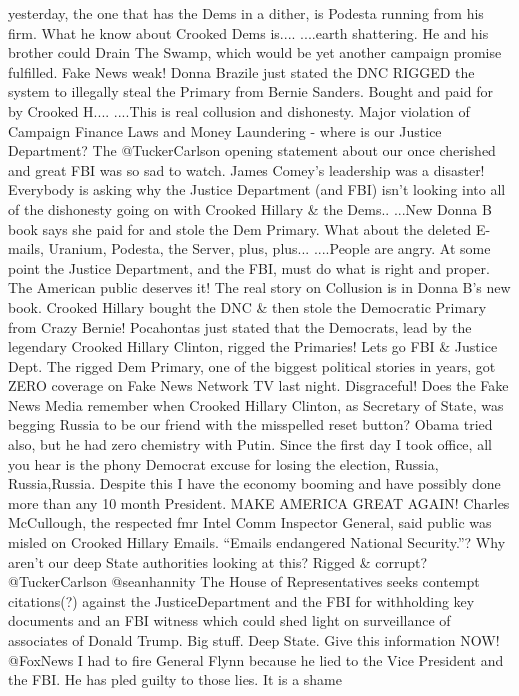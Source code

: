 yesterday, the one that has the Dems in a dither, is Podesta running
from his firm. What he know about Crooked Dems is.... ....earth
shattering. He and his brother could Drain The Swamp, which would be yet
another campaign promise fulfilled. Fake News weak! Donna Brazile just
stated the DNC RIGGED the system to illegally steal the Primary from
Bernie Sanders. Bought and paid for by Crooked H.... ....This is real
collusion and dishonesty. Major violation of Campaign Finance Laws and
Money Laundering - where is our Justice Department? The @TuckerCarlson
opening statement about our once cherished and great FBI was so sad to
watch. James Comey's leadership was a disaster! Everybody is asking why
the Justice Department (and FBI) isn't looking into all of the
dishonesty going on with Crooked Hillary \& the Dems.. ...New Donna B
book says she paid for and stole the Dem Primary. What about the deleted
E-mails, Uranium, Podesta, the Server, plus, plus... ....People are
angry. At some point the Justice Department, and the FBI, must do what
is right and proper. The American public deserves it! The real story on
Collusion is in Donna B's new book. Crooked Hillary bought the DNC \&
then stole the Democratic Primary from Crazy Bernie! Pocahontas just
stated that the Democrats, lead by the legendary Crooked Hillary
Clinton, rigged the Primaries! Lets go FBI \& Justice Dept. The rigged
Dem Primary, one of the biggest political stories in years, got ZERO
coverage on Fake News Network TV last night. Disgraceful! Does the Fake
News Media remember when Crooked Hillary Clinton, as Secretary of State,
was begging Russia to be our friend with the misspelled reset button?
Obama tried also, but he had zero chemistry with Putin. Since the first
day I took office, all you hear is the phony Democrat excuse for losing
the election, Russia, Russia,Russia. Despite this I have the economy
booming and have possibly done more than any 10 month President. MAKE
AMERICA GREAT AGAIN! Charles McCullough, the respected fmr Intel Comm
Inspector General, said public was misled on Crooked Hillary Emails.
``Emails endangered National Security.''? Why aren't our deep State
authorities looking at this? Rigged \& corrupt? @TuckerCarlson
@seanhannity The House of Representatives seeks contempt citations(?)
against the JusticeDepartment and the FBI for withholding key documents
and an FBI witness which could shed light on surveillance of associates
of Donald Trump. Big stuff. Deep State. Give this information NOW!
@FoxNews I had to fire General Flynn because he lied to the Vice
President and the FBI. He has pled guilty to those lies. It is a shame
